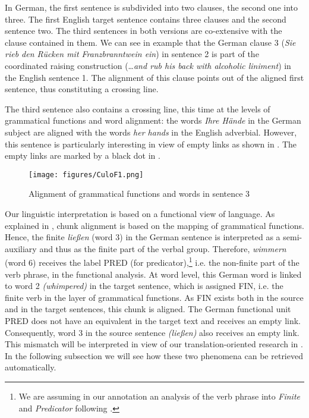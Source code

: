 \documentclass[output=paper]{LSP/langsci}
\begin{document}
In German, the first sentence is subdivided into two clauses, the second one into three. The first English target sentence contains three clauses and the second sentence two. The third sentences in both versions are co-extensive with the clause contained in them. We can see in example  that the German clause 3 (\textit{Sie rieb den Rücken mit Franzbranntwein ein}) in sentence 2 is part of the coordinated raising construction (\ldots\textit{and rub his back with alcoholic liniment}) in the English sentence 1. The alignment of this clause points out of the aligned first sentence, thus constituting a crossing line. 

The third sentence also contains a crossing line, this time at the levels of grammatical functions and word alignment: the words \textit{Ihre Hände} in the German subject are aligned with the words \textit{her hands} in the English adverbial. However, this sentence is particularly interesting in view of empty links as shown in \citet{Hansen-SchirraEtAl2006}. The empty links are marked by a black dot in .

\begin{figure}
\texttt{[image: figures/CuloF1.png]}
\caption{Alignment of grammatical functions and words in sentence 3}
\label{fig:culo:1}
\end{figure}

Our linguistic interpretation is based on a functional view of language. As explained in , chunk alignment is based on the mapping of grammatical functions. Hence, the finite \textit{ließen} (word 3) in the German sentence is interpreted as a semi-auxiliary and thus as the finite part of the verbal group. Therefore, \textit{wimmern} (word 6) receives the label PRED (for predicator),\footnote{We are assuming in our annotation an analysis of the verb phrase into \textit{Finite} and \textit{Predicator} following \citealt[78ff]{halliday_introduction_1985}.} i.e. the non-finite part of the verb phrase, in the functional analysis. At word level, this German word is linked to word 2 \textit{(whimpered)} in the target sentence, which is assigned FIN, i.e. the finite verb in the layer of grammatical functions. As FIN exists both in the source and in the target sentences, this chunk is aligned. The German functional unit PRED does not have an equivalent in the target text and receives an empty link. Consequently, word 3 in the source sentence \textit{(ließen)} also receives an empty link. This mismatch will be interpreted in view of our translation-oriented research in . In the following subsection we will see how these two phenomena can be retrieved automatically.
\end{document}
